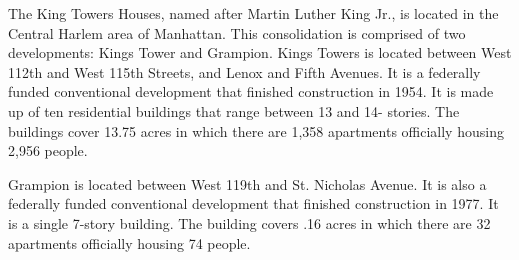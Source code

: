 The King Towers Houses, named after Martin Luther King Jr., is located in the Central Harlem area of Manhattan. This consolidation is comprised of two developments: Kings Tower and Grampion. Kings Towers is located between West 112th and West 115th Streets, and Lenox and Fifth Avenues. It is a federally funded conventional development that finished construction in 1954. It is made up of ten residential buildings that range between 13 and 14- stories. The buildings cover 13.75 acres in which there are 1,358 apartments officially housing 2,956 people.  \par \vspace{.7\baselineskip} \par \vspace{.7\baselineskip}Grampion is located between West 119th and St. Nicholas Avenue. It is also a federally funded conventional development that finished construction in 1977. It is a single 7-story building. The building covers .16 acres in which there are 32 apartments officially housing 74 people.